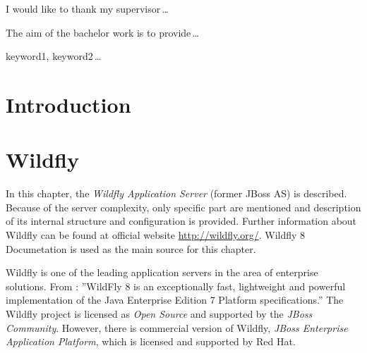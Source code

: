 \documentclass[12pt,oneside]{fithesis2}
\begin{document}
  \FrontMatter                    %
    \ThesisTitlePage                %
    \begin{ThesisDeclaration}       %
      \DeclarationText
      \AdvisorName
    \end{ThesisDeclaration}
    \begin{ThesisThanks}            %
      I would like to thank my supervisor\,\dots
    \end{ThesisThanks}
    \begin{ThesisAbstract}          %
      The aim of the bachelor work is to provide\,\dots
    \end{ThesisAbstract}
    \begin{ThesisKeyWords}          %
      keyword1, keyword2\,\dots
    \end{ThesisKeyWords}
    \tableofcontents                %
  
  \MainMatter                     %
    \chapter{Introduction}   
    
\chapter{Wildfly}
\label{wildfly_chapter}
In this chapter, the \textit{Wildfly Application Server} (former JBoss AS) is described. Because of the server complexity, only specific part are mentioned and description of its internal structure and configuration is provided. Further information about Wildfly can be found at official website \url{http://wildfly.org/}. Wildfly 8 Documetation \cite{wildfly_doc} is used as the main source for this chapter.

Wildfly is one of the leading application servers in the area of enterprise solutions. From \cite[Getting Started with WildFly 8]{wildfly_doc}: ''WildFly 8 is an exceptionally fast, lightweight and powerful implementation of the Java Enterprise Edition 7 Platform specifications.'' The Wildfly project is licensed as \textit{Open Source} and supported by the \textit{JBoss Community}. However, there is commercial version of Wildfly, \textit{JBoss Enterprise Application Platform}, which is licensed and supported by Red Hat.
\end{document}
